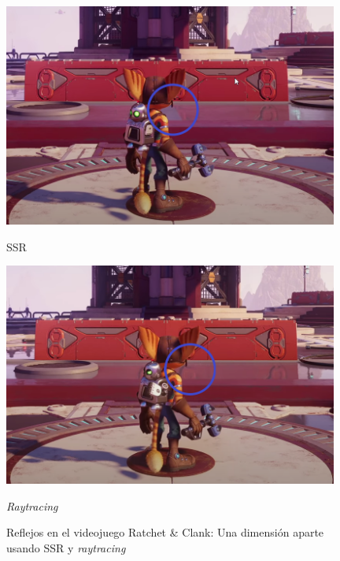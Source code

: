 \begin{figure}[!h]
     \begin{minipage}[c]{0.49\linewidth}
        \centering
        \includegraphics[width=0.98\textwidth]{Plantilla-TFG-master/img/ssr_on.png}
        \caption{SSR}
     \end{minipage}
     \begin{minipage}[c]{0.49\linewidth}
        \centering
        \includegraphics[width=0.98\textwidth]{Plantilla-TFG-master/img/ssr_off.png}
        \caption{\textit{Raytracing}}
     \end{minipage}
     \caption{Reflejos en el videojuego Ratchet \& Clank: Una dimensión aparte usando SSR y \textit{raytracing} \cite{ratchet}}
     \label{fig:ssrVS}
\end{figure}

